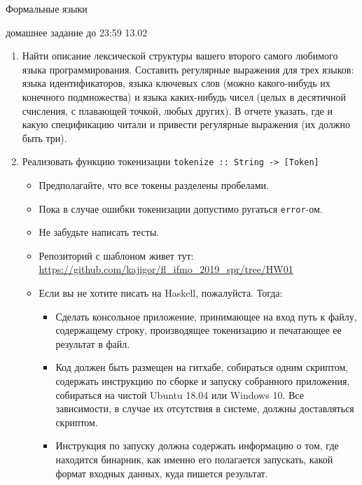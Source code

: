 \documentclass{article}
\begin{document}
\begin{center} {\LARGE Формальные языки} \end{center}

\begin{center} {\Large домашнее задание до 23:59 13.02} \end{center}
\bigskip

\begin{enumerate}
  \item 
  { 
    Найти описание лексической структуры вашего второго самого любимого языка программирования. Составить регулярные выражения для трех языков: языка идентификаторов, языка ключевых слов (можно какого-нибудь их конечного подмножества) и языка каких-нибудь чисел (целых в десятичной счисления, с плавающей точкой, любых других). В отчете указать, где и какую спецификацию читали и привести регулярные выражения (их должно быть три). 
  }
  \item 
  {
    Реализовать функцию токенизации \verb!tokenize :: String -> [Token]!
    \begin{itemize}
        \item Предполагайте, что все токены разделены пробелами.
        \item Пока в случае ошибки токенизации допустимо ругаться \verb!error!-ом.
        \item Не забудьте написать тесты.
        \item Репозиторий с шаблоном живет тут: \href{https://github.com/kajigor/fl_ifmo_2019_spr/tree/HW01}{https://github.com/kajigor/fl\_ifmo\_2019\_spr/tree/HW01}
        \item Если вы не хотите писать на Haskell, пожалуйста. Тогда: 
        \begin{itemize}
            \item Сделать консольное  приложение, принимающее на вход путь к файлу, содержащему строку, производящее токенизацию и печатающее ее результат в файл.
            \item Код должен быть размещен на гитхабе, собираться одним скриптом, содержать инструкцию по сборке и запуску собранного приложения, собираться на чистой Ubuntu 18.04 или Windows 10. Все зависимости, в случае их отсутствия в системе, должны доставляться скриптом.
            \item Инструкция по запуску должна содержать информацию о том, где находится бинарник, как именно его полагается запускать, какой формат входных данных, куда пишется результат.
        \end{itemize}
    \end{itemize}
  }
\end{enumerate}
\end{document}
